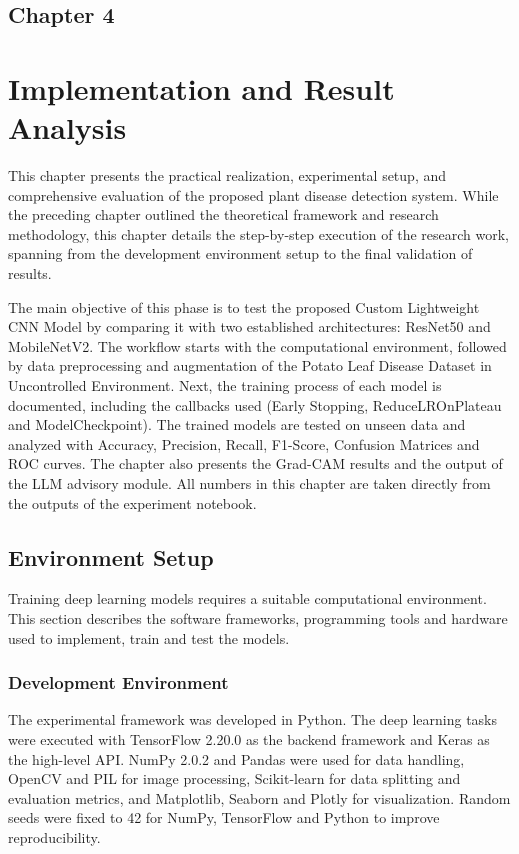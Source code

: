 \begin{center}
    \section*{\fontsize{20}{20}\selectfont Chapter 4}
\end{center}
\vspace{10mm}

\section{Implementation and Result Analysis}

This chapter presents the practical realization, experimental setup, and comprehensive evaluation of the proposed plant disease detection system. While the preceding chapter outlined the theoretical framework and research methodology, this chapter details the step-by-step execution of the research work, spanning from the development environment setup to the final validation of results.

The main objective of this phase is to test the proposed Custom Lightweight CNN Model by comparing it with two established architectures: ResNet50 and MobileNetV2. The workflow starts with the computational environment, followed by data preprocessing and augmentation of the Potato Leaf Disease Dataset in Uncontrolled Environment. Next, the training process of each model is documented, including the callbacks used (Early Stopping, ReduceLROnPlateau and ModelCheckpoint). The trained models are tested on unseen data and analyzed with Accuracy, Precision, Recall, F1-Score, Confusion Matrices and ROC curves. The chapter also presents the Grad-CAM results and the output of the LLM advisory module. All numbers in this chapter are taken directly from the outputs of the experiment notebook.

\subsection{Environment Setup}
Training deep learning models requires a suitable computational environment. This section describes the software frameworks, programming tools and hardware used to implement, train and test the models.

\subsubsection{Development Environment}
The experimental framework was developed in Python. The deep learning tasks were executed with TensorFlow 2.20.0 as the backend framework and Keras as the high-level API. NumPy 2.0.2 and Pandas were used for data handling, OpenCV and PIL for image processing, Scikit-learn for data splitting and evaluation metrics, and Matplotlib, Seaborn and Plotly for visualization. Random seeds were fixed to 42 for NumPy, TensorFlow and Python to improve reproducibility.

